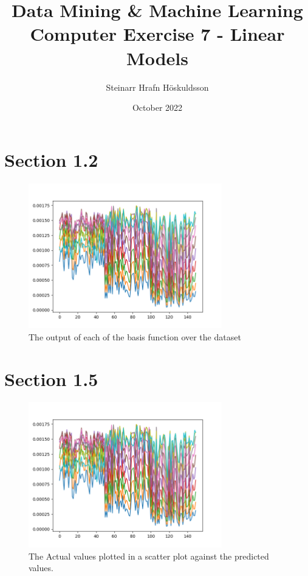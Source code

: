 \documentclass{article}
\title{Data Mining \& Machine Learning \\ \large Computer Exercise 7 - Linear Models}
\author{Steinarr Hrafn Höskuldsson}
\date{October 2022}
\newcommand{\mycomment}[1]{}
\begin{document}
\maketitle
\mycomment{
\begin{figure}[h]
    \centering
    \texttt{[image: LAB3/Basic1.png]}
    \caption{"Switch test" Breadboard set up}
    \label{fig:Switch_test}
\end{figure}



}
\section*{Section 1.2}

\begin{figure}[H]
    \centering
    \includegraphics[width=0.75\textwidth]{07_linear_models/plot_1_2.png}
    \caption{The output of each of the basis function over the dataset}
    \label{fig:section12}
\end{figure}

\section*{Section 1.5}
\begin{figure}[H]
    \centering
    \includegraphics[width=0.75\textwidth]{07_linear_models/plot_1_2.png}
    \caption{The Actual values plotted in a scatter plot against the predicted values.}
    \label{fig:section15}
\end{figure}
\end{document}
